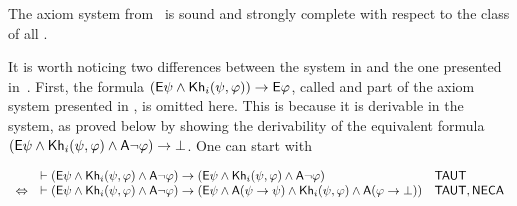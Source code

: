 \medskip

\begin{theorem}\label{th:khi-completeness}
The axiom system from~ is sound and strongly complete with respect to the class of all \ultss.
\end{theorem}

\medskip

It is worth noticing two differences between the system in  and the one presented in~\cite{AFSVQ23report}. First, the formula $\left({\sf E}\psi \land {\sf Kh}_i(\psi,\varphi)\right) \rightarrow {\sf E}\varphi$, called  and part of the axiom system presented in \cite{AFSVQ23report}, is omitted here. This is because it is derivable in the system, as proved below by showing the derivability of the equivalent formula $({\sf E}\psi \wedge {\sf Kh}_i(\psi,\varphi) \wedge {\sf A}\neg\varphi) \rightarrow \bot$. One can start with
%
%
%
%
%
\begin{spcenter}
\begin{small}
$\begin{array}{lll}
                  & \vdash ({\sf E}\psi \wedge {\sf Kh}_i(\psi,\varphi) \wedge {\sf A}\neg\varphi) \rightarrow ({\sf E}\psi \wedge {\sf Kh}_i(\psi,\varphi) \wedge {\sf A}\neg\varphi)                                 & \textsf{TAUT} \\ 
  \Leftrightarrow & \vdash ({\sf E}\psi \wedge {\sf Kh}_i(\psi,\varphi) \wedge {\sf A}\neg\varphi) \rightarrow ({\sf E}\psi \wedge {\sf A}(\psi \rightarrow \psi) \wedge {\sf Kh}_i(\psi,\varphi) \wedge {\sf A}(\varphi \rightarrow \bot)) & \textsf{TAUT},\textsf{NECA}
\end{array}$
\end{small}
\end{spcenter}
%
%
